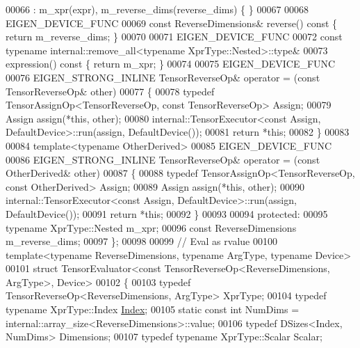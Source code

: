 \begin{DoxyCode}
00066       : m\_xpr(expr), m\_reverse\_dims(reverse\_dims) \{ \}
00067 
00068     EIGEN\_DEVICE\_FUNC
00069     \textcolor{keyword}{const} ReverseDimensions& reverse()\textcolor{keyword}{ const }\{ \textcolor{keywordflow}{return} m\_reverse\_dims; \}
00070 
00071     EIGEN\_DEVICE\_FUNC
00072     \textcolor{keyword}{const} \textcolor{keyword}{typename} internal::remove\_all<typename XprType::Nested>::type&
00073     expression()\textcolor{keyword}{ const }\{ \textcolor{keywordflow}{return} m\_xpr; \}
00074 
00075     EIGEN\_DEVICE\_FUNC
00076     EIGEN\_STRONG\_INLINE TensorReverseOp& operator = (\textcolor{keyword}{const} TensorReverseOp& other)
00077     \{
00078       \textcolor{keyword}{typedef} TensorAssignOp<TensorReverseOp, const TensorReverseOp> Assign;
00079       Assign assign(*\textcolor{keyword}{this}, other);
00080       internal::TensorExecutor<const Assign, DefaultDevice>::run(assign, DefaultDevice());
00081       \textcolor{keywordflow}{return} *\textcolor{keyword}{this};
00082     \}
00083 
00084     \textcolor{keyword}{template}<\textcolor{keyword}{typename} OtherDerived>
00085     EIGEN\_DEVICE\_FUNC
00086     EIGEN\_STRONG\_INLINE TensorReverseOp& operator = (\textcolor{keyword}{const} OtherDerived& other)
00087     \{
00088       \textcolor{keyword}{typedef} TensorAssignOp<TensorReverseOp, const OtherDerived> Assign;
00089       Assign assign(*\textcolor{keyword}{this}, other);
00090       internal::TensorExecutor<const Assign, DefaultDevice>::run(assign, DefaultDevice());
00091       \textcolor{keywordflow}{return} *\textcolor{keyword}{this};
00092     \}
00093 
00094   \textcolor{keyword}{protected}:
00095     \textcolor{keyword}{typename} XprType::Nested m\_xpr;
00096     \textcolor{keyword}{const} ReverseDimensions m\_reverse\_dims;
00097 \};
00098 
00099 \textcolor{comment}{// Eval as rvalue}
00100 \textcolor{keyword}{template}<\textcolor{keyword}{typename} ReverseDimensions, \textcolor{keyword}{typename} ArgType, \textcolor{keyword}{typename} Device>
00101 \textcolor{keyword}{struct }TensorEvaluator<const TensorReverseOp<ReverseDimensions, ArgType>, Device>
00102 \{
00103   \textcolor{keyword}{typedef} TensorReverseOp<ReverseDimensions, ArgType> XprType;
00104   \textcolor{keyword}{typedef} \textcolor{keyword}{typename} XprType::Index \hyperlink{namespace_eigen_a62e77e0933482dafde8fe197d9a2cfde}{Index};
00105   \textcolor{keyword}{static} \textcolor{keyword}{const} \textcolor{keywordtype}{int} NumDims = internal::array\_size<ReverseDimensions>::value;
00106   \textcolor{keyword}{typedef} DSizes<Index, NumDims> Dimensions;
00107   \textcolor{keyword}{typedef} \textcolor{keyword}{typename} XprType::Scalar Scalar;

\end{DoxyCode}
